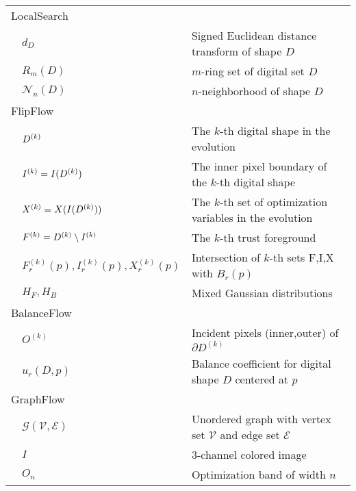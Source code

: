 \begin{longtable}{p{0.5cm}ll}
\multicolumn{3}{l}{LocalSearch}\\
& $d_D$ & Signed Euclidean distance transform of shape $D$\\
& $R_m(D)$ & $m$-ring set of digital set $D$\\
& $\mathcal{N}_n(D)$ & $n$-neighborhood of shape $D$\\[1em]

\multicolumn{3}{l}{FlipFlow}\\
& $D^{(k)}$ & The $k$-th digital shape in the evolution\\
& $I^{(k)} = I(D^{(k)})$ & The inner pixel boundary of the $k$-th digital shape\\
& $X^{(k)} = X(I(D^{(k)}))$ & The $k$-th set of optimization variables in the evolution\\
& $F^{(k)} = D^{(k)} \setminus I^{(k)}$ & The $k$-th trust foreground \\
& $F_r^{(k)}(p),I_r^{(k)}(p),X_r^{(k)}(p)$ & Intersection of $k$-th sets F,I,X with $B_r(p)$\\
& $H_F,H_B$ & Mixed Gaussian distributions\\[1em]

\multicolumn{3}{l}{BalanceFlow}\\
& $O^{(k)}$ & Incident pixels (inner,outer) of $\partial D^{(k)}$\\
& $u_r(D,p)$ & Balance coefficient for digital shape $D$ centered at $p$\\[1em]

\multicolumn{3}{l}{GraphFlow}\\
& $\mathcal{G}(\mathcal{V},\mathcal{E})$ & Unordered graph with vertex set $\mathcal{V}$ and edge set $\mathcal{E}$ \\
& $I$ & $3$-channel colored image\\
& $O_n$ & Optimization band of width $n$\\


\end{longtable}
